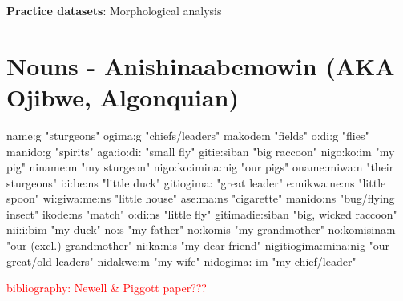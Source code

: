 \documentclass[a4paper,11pt]{article}
\begin{document}
\begin{center}
\Large{\textbf{Practice datasets}: Morphological analysis}
\end{center}


\section{Nouns - Anishinaabemowin (AKA Ojibwe, Algonquian)}

\begin{multicols}{2}
\begin{exe}
\ex name:g "sturgeons"
\ex ogima:g "chiefs/leaders"
\ex makode:n "fields"
\ex o:d{\textyogh}i:g "flies"
\ex manido:g "spirits"
\ex aga:io:d{\textyogh}i: "small fly"
\ex gitie:siban "big raccoon"
\ex nigo:ko:im "my pig"
\ex niname:m "my sturgeon"
\ex nigo:ko:imina:nig "our pigs"
\ex oname:miwa:n "their sturgeons"
\ex {\textyogh}i:i:be:ns "little duck"
\ex git{\textyogh}iogima: "great leader"
\columnbreak
\ex e:mikwa:ne:ns "little spoon"
\ex wi:giwa:me:ns "little house"
\ex ase:ma:ns "cigarette"
\ex manido:ns "bug/flying insect" 
\ex ikode:ns "match"
\ex o:d{\textyogh}i:ns "little fly"
\ex gitimad{\textyogh}ie:siban "big, wicked raccoon"
\ex ni{\textyogh}i:i:bim "my duck"
\ex no:s "my father"
\ex no:komis "my grandmother"
\ex no:komisina:n "our (excl.) grandmother"
\ex ni:ka:nis "my dear friend"
\ex nigitiogima:mina:nig "our great/old leaders"
\ex nidakwe:m "my wife"
\ex nidogima:-im "my chief/leader"
\end{exe}
\end{multicols}



\textcolor{red}{bibliography: Newell \& Piggott paper???}
\end{document}
